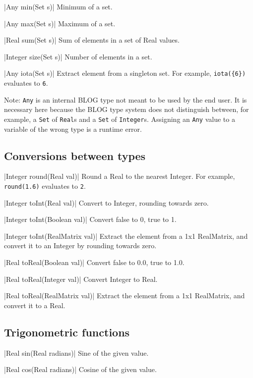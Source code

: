 \blog|Any min(Set s)|
\myindent Minimum of a set.

\blog|Any max(Set s)|
\myindent Maximum of a set.

\blog|Real sum(Set s)|
\myindent Sum of elements in a set of Real values.

\blog|Integer size(Set s)|
\myindent Number of elements in a set.

\blog|Any iota(Set s)|
\myindent Extract element from a singleton set.
For example, \verb|iota({6})| evaluates to \verb|6|.

Note: \verb|Any| is an internal BLOG type not meant to be used by the end user.
It is necessary here because the BLOG type system does not distinguish between,
for example, a \verb|Set| of \verb|Real|s and a \verb|Set| of \verb|Integer|s.
Assigning an \verb|Any| value to a variable of the wrong type is a runtime
error.


\subsection{Conversions between types}
\label{sec:builtin-conversions}

\blog|Integer round(Real val)|
\myindent Round a Real to the nearest Integer.
For example, \verb|round(1.6)| evaluates to \verb|2|.

\blog|Integer toInt(Real val)|
\myindent Convert to Integer, rounding towards zero.

\blog|Integer toInt(Boolean val)|
\myindent Convert false to 0, true to 1.

\blog|Integer toInt(RealMatrix val)|
\myindent Extract the element from a 1x1 RealMatrix, and convert it to an
Integer by rounding towards zero.

\blog|Real toReal(Boolean val)|
\myindent Convert false to 0.0, true to 1.0.

\blog|Real toReal(Integer val)|
\myindent Convert Integer to Real.

\blog|Real toReal(RealMatrix val)|
\myindent Extract the element from a 1x1 RealMatrix, and convert it to a Real.


\subsection{Trigonometric functions}
\label{sec:builtin-trig}

\blog|Real sin(Real radians)|
\myindent Sine of the given value.

\blog|Real cos(Real radians)|
\myindent Cosine of the given value.

